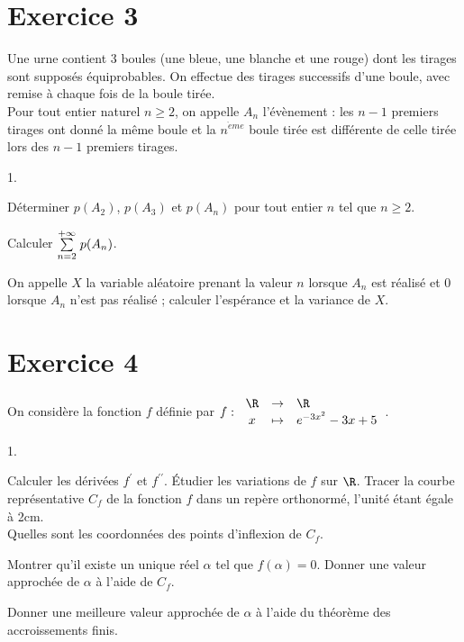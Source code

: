 \documentclass[11pt]{article}%
\begin{document}
\section*{Exercice 3}

Une urne contient 3 boules (une bleue, une blanche et une rouge) dont
les
tirages sont supposés équiprobables. On effectue des tirages successifs
d'une boule, avec remise à chaque fois de la boule tirée.\\
Pour tout entier naturel $n\geq 2$, on appelle $A_{n}$ l'évènement :
les $n-1$ premiers tirages ont donné la même boule et la
$n^{\grave{e}me}$
boule tirée est différente de celle tirée lors des $n-1$ premiers
tirages.

\begin{noliste}{1.}
 \setlength{\itemsep}{4mm}
\item Déterminer $p(A_{2})$, $p(A_{3})$ et $p(A_{n})$ pour tout entier
$n$
tel que $n\geq 2$.

\item Calculer ${\textstyle\sum\limits_{n = 2}^{+ \infty }}\hspace{.1cm}p(A_{n})$.

\item On appelle $X$ la variable aléatoire prenant la valeur $n$
lorsque $A_{n}$ est réalisé et $0$ lorsque $A_{n}$ n'est pas réalisé ;
calculer l'espérance et la variance de $X$.
\end{noliste}

\section*{Exercice 4}

On considère la fonction $f$ définie par $f :\left. 
\begin{array}{ccl}
\R & \rightarrow & \R \\
x & \mapsto & e^{-3x^{2}}-3x + 5
\end{array}
\right. $.

\begin{noliste}{1.}
 \setlength{\itemsep}{4mm}
\item Calculer les dérivées $f^{\prime }$ et $f^{\prime \prime }$.
Étudier
les variations de $f$ sur $\R$. Tracer la courbe représentative $C_{f}$
de la fonction $f$ dans un repère orthonormé, l'unité étant égale à
2cm.\\
Quelles sont les coordonnées des points d'inflexion de $C_{f}$.

\item Montrer qu'il existe un unique réel $\alpha $ tel que $f(\alpha )
= 0$.
Donner une valeur approchée de $\alpha $ à l'aide de $C_{f}$.

\item Donner une meilleure valeur approchée de $\alpha $ à l'aide du
théorème des accroissements finis.
\end{noliste}

\label{fin}
\end{document}
